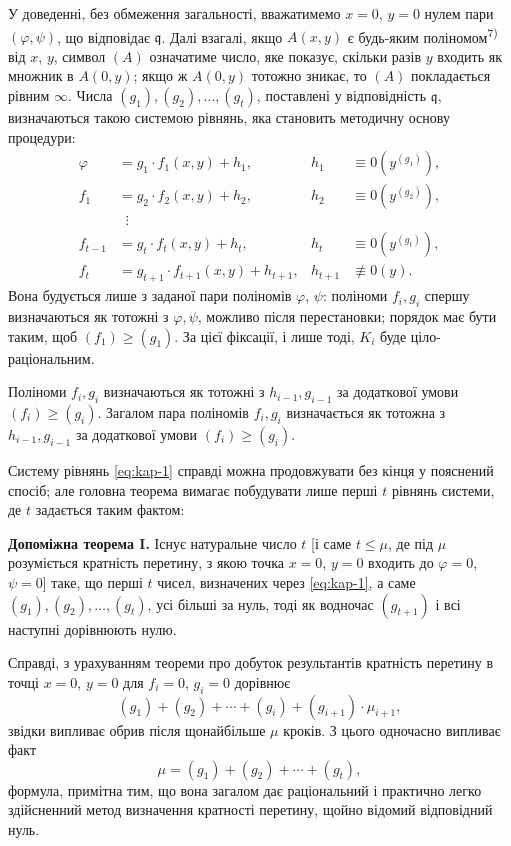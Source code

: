 \documentclass[11pt]{article}
\theoremstyle{plain}
\begin{document}
У доведенні, без обмеження загальності, вважатимемо $x = 0$,
$y = 0$ нулем пари $(\varphi, \psi)$, що відповідає
$\mathfrak{q}$. Далі взагалі, якщо $A(x,y)$ є будь-яким
поліномом\textsuperscript{7)} від $x$, $y$, символ $(A)$ означатиме
число, яке показує, скільки разів $y$ входить як множник в $A(0,y)$;
якщо ж $A(0,y)$ тотожно зникає, то $(A)$ покладається рівним
$\infty$. Числа $(g_{1}), (g_{2}), \ldots, (g_{t})$, поставлені у
відповідність $\mathfrak{q}$, визначаються такою системою рівнянь,
яка становить методичну основу процедури:
\begin{equation}\label{eq:kap-1}
\begin{aligned}
\varphi &= g_{1} \cdot f_{1}(x,y) + h_{1}, & h_{1} &\equiv 0(y^{(g_{1})}),\\
f_{1} &= g_{2} \cdot f_{2}(x,y) + h_{2}, & h_{2} &\equiv 0(y^{(g_{2})}),\\
&\;\;\vdots &&\\
f_{t-1} &= g_{t} \cdot f_{t}(x,y) + h_{t}, & h_{t} &\equiv 0(y^{(g_{t})}),\\
f_{t} &= g_{t+1} \cdot f_{t+1}(x,y) + h_{t+1}, & h_{t+1} &\not\equiv 0(y).
\end{aligned}
\end{equation}
Вона будується лише з заданої пари поліномів $\varphi$, $\psi$:
поліноми $f_{i}, g_{i}$ спершу визначаються як тотожні з
$\varphi, \psi$, можливо після перестановки; порядок має бути таким,
щоб $(f_{1}) \geq (g_{1})$. За цієї фіксації, і лише тоді, $K_{i}$
буде ціло-раціональним.

Поліноми $f_{i}, g_{i}$ визначаються як тотожні з $h_{i-1}, g_{i-1}$
за додаткової умови $(f_{i}) \geq (g_{i})$. Загалом пара поліномів
$f_{i}, g_{i}$ визначається як тотожна з $h_{i-1}, g_{i-1}$ за
додаткової умови $(f_{i}) \geq (g_{i})$.

Систему рівнянь \eqref{eq:kap-1} справді можна продовжувати без кінця
у пояснений спосіб; але головна теорема вимагає побудувати лише
перші $t$ рівнянь системи, де $t$ задається таким фактом:

\smallskip
\textbf{Допоміжна теорема I.} Існує натуральне число $t$ [і саме
$t \leq \mu$, де під $\mu$ розуміється кратність перетину, з якою
точка $x = 0$, $y = 0$ входить до $\varphi = 0$, $\psi = 0$] таке, що
перші $t$ чисел, визначених через \eqref{eq:kap-1}, а саме
$(g_{1}), (g_{2}), \ldots, (g_{t})$, усі більші за нуль, тоді як
водночас $(g_{t+1})$ і всі наступні дорівнюють нулю.

Справді, з урахуванням теореми про добуток результантів кратність
перетину в точці $x = 0$, $y = 0$ для $f_{i} = 0$, $g_{i} = 0$
дорівнює
\[
(g_{1}) + (g_{2}) + \cdots + (g_{i}) + (g_{i+1}) \cdot \mu_{i+1},
\]
звідки випливає обрив після щонайбільше $\mu$ кроків. З цього
одночасно випливає факт
\begin{equation}\label{eq:kap-2}
\mu = (g_{1}) + (g_{2}) + \cdots + (g_{t}),
\end{equation}
формула, примітна тим, що вона загалом дає раціональний і практично
легко здійсненний метод визначення кратності перетину, щойно відомий
відповідний нуль.
\end{document}
